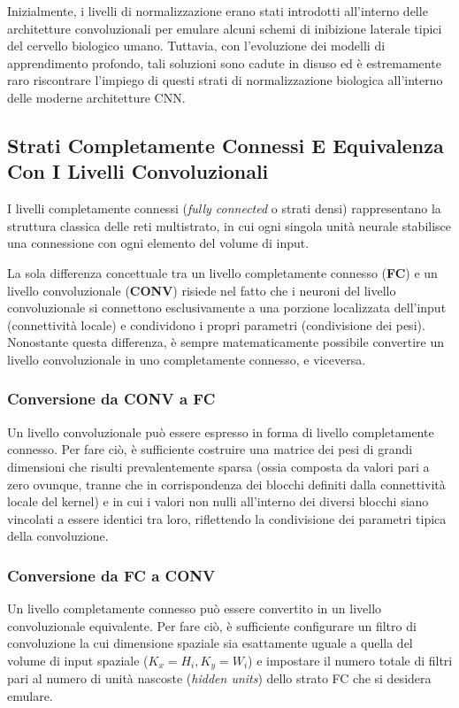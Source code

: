 ﻿\documentclass[11pt, a4paper]{article}
\begin{document}
Inizialmente, i livelli di normalizzazione erano stati introdotti all'interno delle architetture convoluzionali per emulare alcuni schemi di inibizione laterale tipici del cervello biologico umano. Tuttavia, con l'evoluzione dei modelli di apprendimento profondo, tali soluzioni sono cadute in disuso ed è estremamente raro riscontrare l'impiego di questi strati di normalizzazione biologica all'interno delle moderne architetture CNN.

\subsection{Strati Completamente Connessi E Equivalenza Con I Livelli Convoluzionali}

I livelli completamente connessi (\emph{fully connected} o strati densi) rappresentano la struttura classica delle reti multistrato, in cui ogni singola unità neurale stabilisce una connessione con ogni elemento del volume di input.

La sola differenza concettuale tra un livello completamente connesso (\textbf{FC}) e un livello convoluzionale (\textbf{CONV}) risiede nel fatto che i neuroni del livello convoluzionale si connettono esclusivamente a una porzione localizzata dell'input (connettività locale) e condividono i propri parametri (condivisione dei pesi). Nonostante questa differenza, è sempre matematicamente possibile convertire un livello convoluzionale in uno completamente connesso, e viceversa.

\subsubsection{Conversione da CONV a FC}
Un livello convoluzionale può essere espresso in forma di livello completamente connesso. Per fare ciò, è sufficiente costruire una matrice dei pesi di grandi dimensioni che risulti prevalentemente sparsa (ossia composta da valori pari a zero ovunque, tranne che in corrispondenza dei blocchi definiti dalla connettività locale del kernel) e in cui i valori non nulli all'interno dei diversi blocchi siano vincolati a essere identici tra loro, riflettendo la condivisione dei parametri tipica della convoluzione.

\subsubsection{Conversione da FC a CONV}
Un livello completamente connesso può essere convertito in un livello convoluzionale equivalente. Per fare ciò, è sufficiente configurare un filtro di convoluzione la cui dimensione spaziale sia esattamente uguale a quella del volume di input spaziale ($K_x = H_i, K_y = W_i$) e impostare il numero totale di filtri pari al numero di unità nascoste (\emph{hidden units}) dello strato FC che si desidera emulare.
\end{document}
